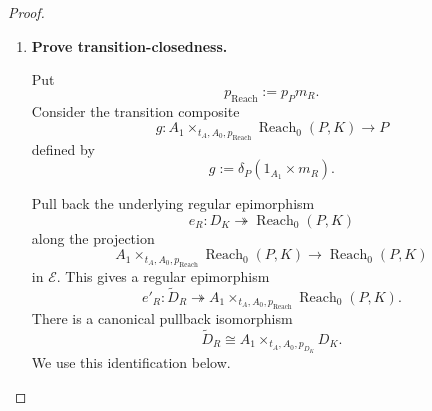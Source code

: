 \begin{proof}
    \begin{enumerate}
        \item \textbf{Prove transition-closedness.}

        Put
        \[
            p_{\operatorname{Reach}}
            :=
            p_Pm_R.
        \]
        Consider the transition composite
        \[
            g:
            A_1
            \times_{t_A,A_0,p_{\operatorname{Reach}}}
            \operatorname{Reach}_0(P,K)
            \to
            P
        \]
        defined by
        \[
            g
            :=
            \delta_P(1_{A_1}\times m_R).
        \]

        Pull back the underlying regular epimorphism
        \[
            e_R:D_K\twoheadrightarrow\operatorname{Reach}_0(P,K)
        \]
        along the projection
        \[
            A_1
            \times_{t_A,A_0,p_{\operatorname{Reach}}}
            \operatorname{Reach}_0(P,K)
            \to
            \operatorname{Reach}_0(P,K)
        \]
        in \(\mathcal E\). This gives a regular epimorphism
        \[
            e'_R:
            \widetilde D_R
            \twoheadrightarrow
            A_1
            \times_{t_A,A_0,p_{\operatorname{Reach}}}
            \operatorname{Reach}_0(P,K).
        \]
        There is a canonical pullback isomorphism
        \[
            \widetilde D_R
            \cong
            A_1\times_{t_A,A_0,p_{D_K}}D_K.
        \]
        We use this identification below.


\end{enumerate}
\end{proof}
